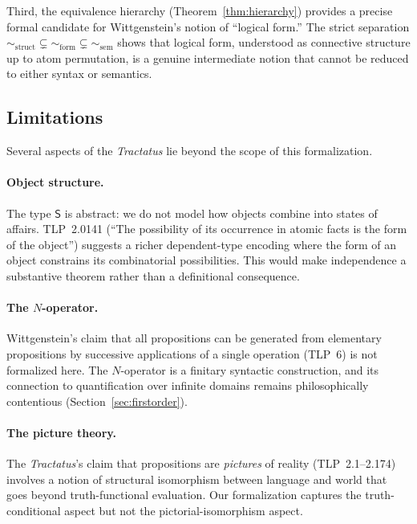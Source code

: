 \documentclass[10pt, letterpaper]{article}
\theoremstyle{definition}
\theoremstyle{remark}
\newcommand{\Sach}{\mathsf{S}}
\newcommand{\structEq}{\sim_{\mathrm{struct}}}
\newcommand{\formEq}{\sim_{\mathrm{form}}}
\newcommand{\semEq}{\sim_{\mathrm{sem}}}
\begin{document}
Third, the equivalence hierarchy (Theorem~\ref{thm:hierarchy})
provides a precise formal candidate for Wittgenstein's
notion of ``logical form.''  The strict separation $\structEq
\subsetneq \formEq \subsetneq \semEq$ shows that logical form,
understood as connective structure up to atom permutation, is a
genuine intermediate notion that cannot be reduced to either
syntax or semantics.

\subsection{Limitations}
\label{sec:limitations}

Several aspects of the \emph{Tractatus} lie beyond the scope of
this formalization.

\paragraph{Object structure.}
The type $\Sach$ is abstract: we do not model how objects combine
into states of affairs.  TLP~2.0141 (``The possibility of its
occurrence in atomic facts is the form of the object'') suggests
a richer dependent-type encoding where the form of an object
constrains its combinatorial possibilities.  This would make
independence a substantive theorem rather than a definitional
consequence.

\paragraph{The $N$-operator.}
Wittgenstein's claim that all propositions can be generated from
elementary propositions by successive applications of a single
operation (TLP~6) is not formalized here.  The $N$-operator is
a finitary syntactic construction, and its connection to
quantification over infinite domains remains philosophically
contentious (Section~\ref{sec:firstorder}).

\paragraph{The picture theory.}
The \emph{Tractatus}'s claim that propositions are
\emph{pictures} of reality (TLP~2.1--2.174) involves a notion
of structural isomorphism between language and world that goes
beyond truth-functional evaluation.  Our formalization captures
the truth-conditional aspect but not the pictorial-isomorphism
aspect.
\end{document}

